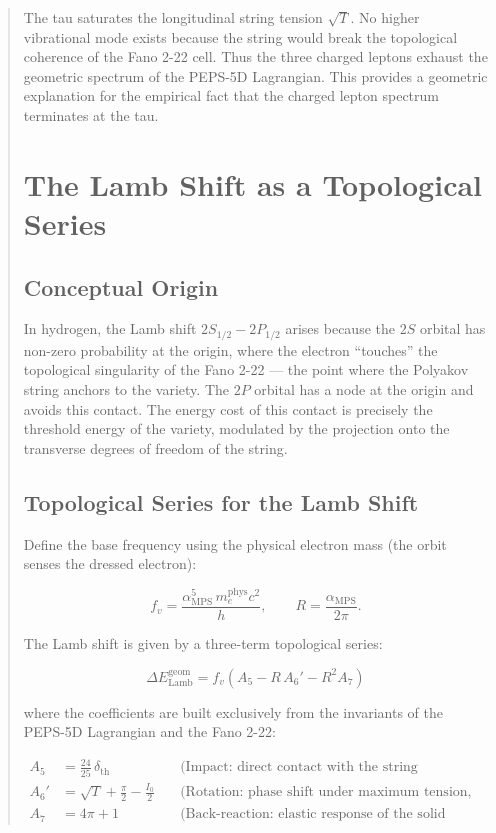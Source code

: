 \documentclass[12pt]{article}
\begin{document}
\begin{abstract}
The tau saturates the longitudinal string tension \(\sqrt{T}\). No higher vibrational mode exists because the string would break the topological coherence of the Fano 2-22 cell. Thus the three charged leptons exhaust the geometric spectrum of the PEPS-5D Lagrangian. This provides a geometric explanation for the empirical fact that the charged lepton spectrum terminates at the tau.

\section{The Lamb Shift as a Topological Series}

\subsection{Conceptual Origin}

In hydrogen, the Lamb shift \(2S_{1/2} - 2P_{1/2}\) arises because the \(2S\) orbital has non-zero probability at the origin, where the electron ``touches'' the topological singularity of the Fano 2-22 — the point where the Polyakov string anchors to the variety. The \(2P\) orbital has a node at the origin and avoids this contact. The energy cost of this contact is precisely the threshold energy of the variety, modulated by the projection onto the transverse degrees of freedom of the string.

\subsection{Topological Series for the Lamb Shift}

Define the base frequency using the physical electron mass (the orbit senses the dressed electron):

\[
f_v = \frac{\alpha_{\text{MPS}}^5 \, m_e^{\text{phys}} c^2}{h}, \qquad
R = \frac{\alpha_{\text{MPS}}}{2\pi}.
\]

The Lamb shift is given by a three-term topological series:

\begin{equation}
\boxed{
\Delta E_{\text{Lamb}}^{\text{geom}} = f_v \left( A_5 - R\,A_6' - R^2 A_7 \right)
}
\label{eq:lamb_series}
\end{equation}

where the coefficients are built exclusively from the invariants of the PEPS-5D Lagrangian and the Fano 2-22:

\begin{align}
A_5 &= \frac{24}{25}\,\delta_{\text{th}} \quad &\text{(Impact: direct contact with the string singularity)}\\
A_6' &= \sqrt{T} + \frac{\pi}{2} - \frac{I_0}{2} \quad &\text{(Rotation: phase shift under maximum tension, corrected by hinge orbit)}\\
A_7 &= 4\pi + 1 \quad &\text{(Back-reaction: elastic response of the solid angle)}
\end{align}


\end{abstract}
\end{document}

